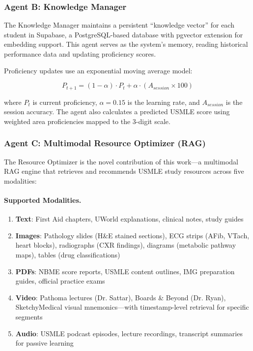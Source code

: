 \subsubsection{Agent B: Knowledge Manager}

The Knowledge Manager maintains a persistent ``knowledge vector'' for each student in Supabase, a PostgreSQL-based database with pgvector extension for embedding support. This agent serves as the system's memory, reading historical performance data and updating proficiency scores.

Proficiency updates use an exponential moving average model:

\begin{equation}
P_{t+1} = (1 - \alpha) \cdot P_t + \alpha \cdot (A_{session} \times 100)
\end{equation}

where $P_t$ is current proficiency, $\alpha = 0.15$ is the learning rate, and $A_{session}$ is the session accuracy. The agent also calculates a predicted USMLE score using weighted area proficiencies mapped to the 3-digit scale.

\subsubsection{Agent C: Multimodal Resource Optimizer (RAG)}

The Resource Optimizer is the novel contribution of this work—a multimodal RAG engine that retrieves and recommends USMLE study resources across five modalities:

\paragraph{Supported Modalities.}
\begin{enumerate}
    \item \textbf{Text}: First Aid chapters, UWorld explanations, clinical notes, study guides
    \item \textbf{Images}: Pathology slides (H\&E stained sections), ECG strips (AFib, VTach, heart blocks), radiographs (CXR findings), diagrams (metabolic pathway maps), tables (drug classifications)
    \item \textbf{PDFs}: NBME score reports, USMLE content outlines, IMG preparation guides, official practice exams
    \item \textbf{Video}: Pathoma lectures (Dr. Sattar), Boards \& Beyond (Dr. Ryan), SketchyMedical visual mnemonics—with timestamp-level retrieval for specific segments
    \item \textbf{Audio}: USMLE podcast episodes, lecture recordings, transcript summaries for passive learning
\end{enumerate}


